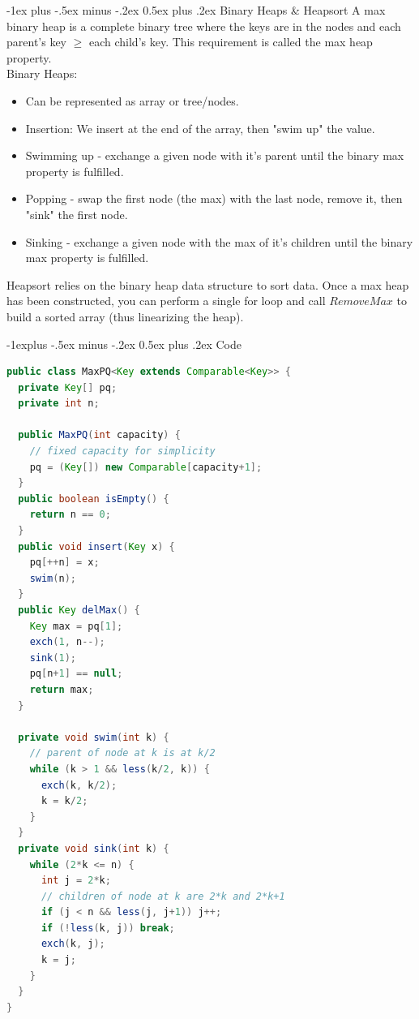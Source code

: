 \documentclass[letterpaper, 8pt]{extarticle}
\makeatletter
\renewcommand{\section}{\@startsection{section}{1}{0mm}%
                                {-1ex plus -.5ex minus -.2ex}%
                                {0.5ex plus .2ex}%
                                {\normalfont\normalsize\bfseries}}
\renewcommand{\subsection}{\@startsection{subsection}{2}{0mm}%
                                {-1explus -.5ex minus -.2ex}%
                                {0.5ex plus .2ex}%
                                {\normalfont\small\bfseries}}
\makeatother
\begin{document}
\begin{multicols*}{4}
  \section{Binary Heaps \& Heapsort}
  A max binary heap is a complete binary tree where
  the keys are in the nodes and each parent's key $\geq$ each child's key.
  This requirement is called the max heap property.
  \\
  Binary Heaps:
  \begin{itemize}
    \item Can be represented as array or tree/nodes.
    \item Insertion: We insert at the end of the array, then "swim up" the value.
    \item Swimming up - exchange a given node with it's parent until the binary max property is fulfilled.
    \item Popping - swap the first node (the max) with the last node, remove it, then "sink" the first node.
    \item Sinking - exchange a given node with the max of it's children until the binary max property is fulfilled.
  \end{itemize}

  Heapsort relies on the binary heap data structure to sort data.
  Once a max heap has been constructed, you can perform a single for loop
  and call $RemoveMax$ to build a sorted array (thus linearizing the heap).

  \subsection{Code}
  \begin{lstlisting}[language=Java, breaklines=true, postbreak=\mbox{\textcolor{red}{$\hookrightarrow$}\space}]
public class MaxPQ<Key extends Comparable<Key>> {
  private Key[] pq;
  private int n;

  public MaxPQ(int capacity) {
    // fixed capacity for simplicity
    pq = (Key[]) new Comparable[capacity+1];
  }
  public boolean isEmpty() {
    return n == 0;
  }
  public void insert(Key x) {
    pq[++n] = x;
    swim(n);
  }
  public Key delMax() {
    Key max = pq[1];
    exch(1, n--);
    sink(1);
    pq[n+1] == null;
    return max;
  }

  private void swim(int k) {
    // parent of node at k is at k/2
    while (k > 1 && less(k/2, k)) {
      exch(k, k/2);
      k = k/2;
    }
  }
  private void sink(int k) {
    while (2*k <= n) {
      int j = 2*k;
      // children of node at k are 2*k and 2*k+1
      if (j < n && less(j, j+1)) j++;
      if (!less(k, j)) break;
      exch(k, j);
      k = j;
    }
  }
}
  \end{lstlisting}


\end{multicols*}
\end{document}
